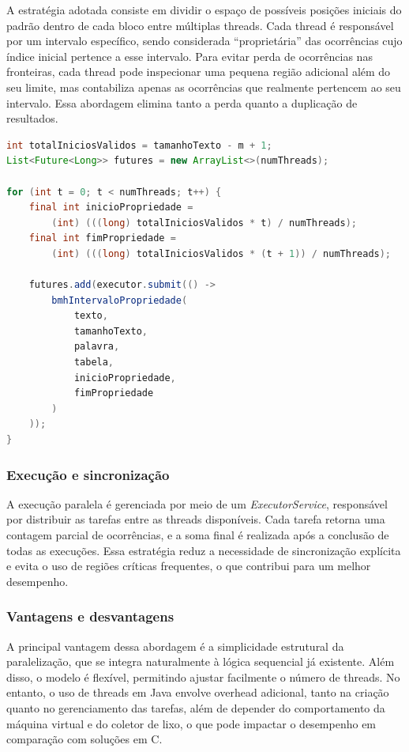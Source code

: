 \documentclass[10pt,twocolumn,a4paper]{article}
\begin{document}
A estratégia adotada consiste em dividir o espaço de possíveis posições iniciais do padrão dentro de cada bloco entre múltiplas threads. Cada thread é responsável por um intervalo específico, sendo considerada ``proprietária'' das ocorrências cujo índice inicial pertence a esse intervalo. Para evitar perda de ocorrências nas fronteiras, cada thread pode inspecionar uma pequena região adicional além do seu limite, mas contabiliza apenas as ocorrências que realmente pertencem ao seu intervalo. Essa abordagem elimina tanto a perda quanto a duplicação de resultados.

\begin{lstlisting}[language=Java, caption={Divisão do espaço de busca em intervalos de propriedade em Java}]
int totalIniciosValidos = tamanhoTexto - m + 1;
List<Future<Long>> futures = new ArrayList<>(numThreads);

for (int t = 0; t < numThreads; t++) {
    final int inicioPropriedade =
        (int) (((long) totalIniciosValidos * t) / numThreads);
    final int fimPropriedade =
        (int) (((long) totalIniciosValidos * (t + 1)) / numThreads);

    futures.add(executor.submit(() ->
        bmhIntervaloPropriedade(
            texto,
            tamanhoTexto,
            palavra,
            tabela,
            inicioPropriedade,
            fimPropriedade
        )
    ));
}
\end{lstlisting}

\subsubsection{Execução e sincronização}

A execução paralela é gerenciada por meio de um \textit{ExecutorService}, responsável por distribuir as tarefas entre as threads disponíveis. Cada tarefa retorna uma contagem parcial de ocorrências, e a soma final é realizada após a conclusão de todas as execuções. Essa estratégia reduz a necessidade de sincronização explícita e evita o uso de regiões críticas frequentes, o que contribui para um melhor desempenho.

\subsubsection{Vantagens e desvantagens}

A principal vantagem dessa abordagem é a simplicidade estrutural da paralelização, que se integra naturalmente à lógica sequencial já existente. Além disso, o modelo é flexível, permitindo ajustar facilmente o número de threads. No entanto, o uso de threads em Java envolve overhead adicional, tanto na criação quanto no gerenciamento das tarefas, além de depender do comportamento da máquina virtual e do coletor de lixo, o que pode impactar o desempenho em comparação com soluções em C.
\end{document}
